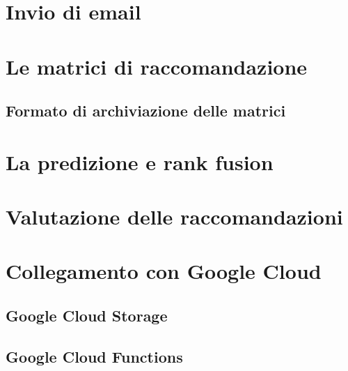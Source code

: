 \section{Invio di email}

\section{Le matrici di raccomandazione}
\subsection{Formato di archiviazione delle matrici}

\section{La predizione e rank fusion}

\section{Valutazione delle raccomandazioni}

\section{Collegamento con Google Cloud}
\subsection{Google Cloud Storage}
\subsection{Google Cloud Functions}
